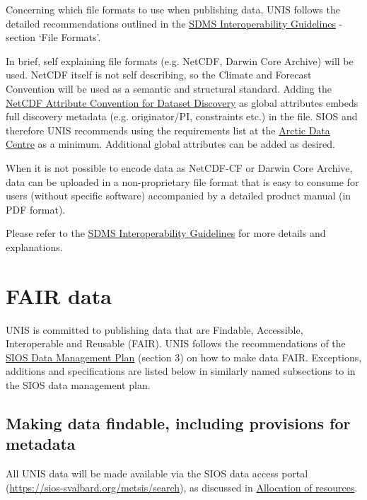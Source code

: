 \documentclass[a4paper,english, 11pt]{article}
\begin{document}
Concerning which file formats to use when publishing data, UNIS follows the detailed recommendations outlined in the \href{https://sios-svalbard.org/sites/sios-svalbard.org/files/common/SDMS_Interoperability_Guidelines.pdf}{SDMS Interoperability Guidelines} - section `File Formats'.

In brief, self explaining file formats (e.g. NetCDF, Darwin Core Archive) will be used. NetCDF itself is not self describing, so the Climate and Forecast Convention will be used as a semantic and structural standard. Adding the \href{https://wiki.esipfed.org/Attribute_Convention_for_Data_Discovery_1-3}{NetCDF Attribute Convention for Dataset Discovery} as global attributes embeds full discovery
metadata (e.g. originator/PI, constraints etc.) in the file. SIOS and therefore UNIS recommends using the requirements list at the \href{https://adc.met.no/node/4}{Arctic Data Centre} as a minimum. Additional global attributes can be added as desired.

When it is not possible to encode data as NetCDF-CF or Darwin Core Archive, data can be uploaded in a non-proprietary file format that is easy to consume for users (without specific software) accompanied by a detailed product manual (in PDF format).

Please refer to the \href{https://sios-svalbard.org/sites/sios-svalbard.org/files/common/SDMS_Interoperability_Guidelines.pdf}{SDMS Interoperability Guidelines} for more details and explanations.

\section{FAIR data}
\label{s:fair}

UNIS is committed to publishing data that are Findable, Accessible, Interoperable and Reusable (FAIR). UNIS follows the recommendations of the \href{https://sios-svalbard.org/sites/sios-svalbard.org/files/common/SIOS_Data_Management_Plan.pdf}{SIOS Data Management Plan} (section 3) on how to make data FAIR. Exceptions, additions and specifications are listed below in similarly named subsections to in the SIOS data management plan.

\subsection{Making data findable, including provisions for metadata}
\label{ss:findable}

All UNIS data will be made available via the SIOS data access portal (\url{https://sios-svalbard.org/metsis/search}), as discussed in \href{s:resources}{Allocation of resources}. 
\end{document}
